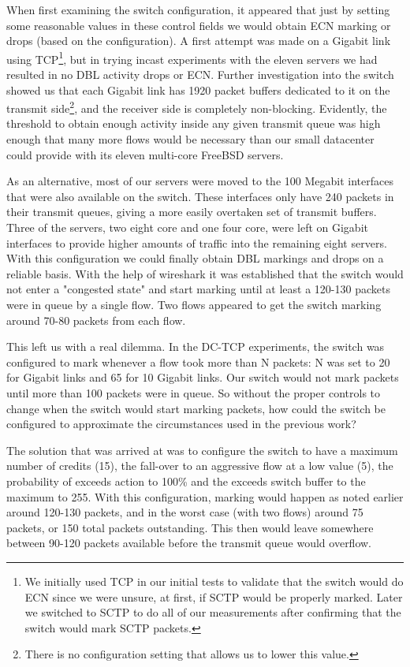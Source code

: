 \documentclass[12pt]{article}
\begin{document}
 When first examining the switch configuration, it appeared that just by setting some reasonable values in these
 control fields we would obtain ECN marking or drops (based on the configuration). A first attempt was made on a Gigabit
 link using TCP\footnote{We initially used TCP in our initial tests to validate that the switch would do ECN since
 we were unsure, at first, if SCTP would be properly marked. Later we switched to SCTP to do all of our measurements
 after confirming that the switch would mark SCTP packets.},
 but in trying incast experiments with the eleven servers we had resulted in no DBL  
 activity drops or ECN. Further investigation into the switch showed us that each Gigabit link has 1920 packet
 buffers dedicated to it on the transmit side\footnote{There is no configuration setting that allows us
 to lower this value.}, and the receiver side is completely non-blocking. Evidently, the
 threshold to obtain enough activity inside any given transmit queue was high enough that many more
 flows would be necessary than our small datacenter could provide with its eleven multi-core FreeBSD servers. 
 
 As an alternative, most of our servers were moved to the 100 Megabit interfaces that were also available
 on the switch. These interfaces only have 240 packets in their transmit queues, giving a more easily
 overtaken set of transmit buffers. Three of the servers,
 two eight core and one four core, were left on Gigabit interfaces to provide higher amounts of traffic
 into the remaining eight servers. With this configuration we could finally obtain DBL markings and drops
 on a reliable basis. With the help of wireshark it was established that the switch would not
 enter a "congested state" and start marking until at least a 120-130 packets were in queue by a single
 flow. Two flows appeared to get the switch marking around 70-80 packets from each flow.
 
 This left us with a real dilemma. In the DC-TCP experiments, the switch was configured to mark
 whenever a flow took more than N packets:  N was set to 20 for Gigabit links and 65 for
 10 Gigabit links. Our switch would not mark packets until more than 100 packets were in queue. So
 without the proper controls to change when the switch would start marking packets,  how could the switch 
 be configured to approximate the circumstances used in the previous work?
 
 The solution that was arrived at was to configure the switch to have a maximum number
 of credits (15), the fall-over to an aggressive flow at a low value (5), the probability
 of exceeds action to 100\% and the exceeds switch buffer to the maximum to 255. With
 this configuration, marking would happen as noted earlier around 120-130 packets, and
 in the worst case (with two flows) around 75 packets, or 150 total packets outstanding. This then
 would leave somewhere between 90-120 packets available before the transmit queue would overflow.
 
\end{document}
